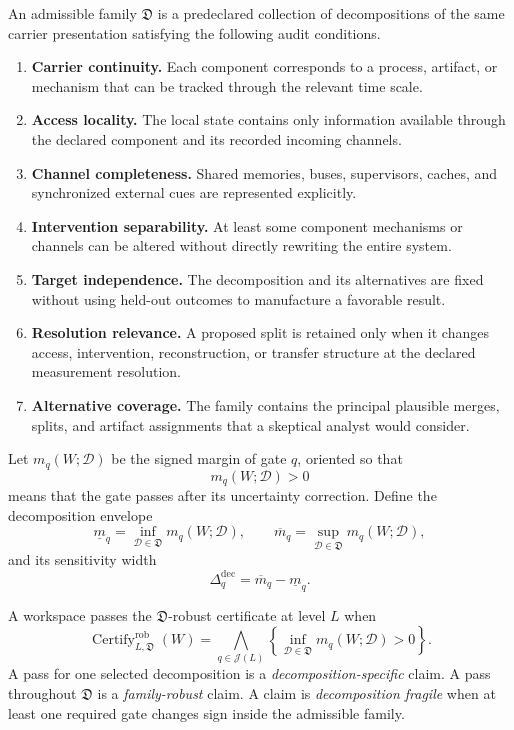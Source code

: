\begin{definition}
\label{def:admissible-decomposition-family}
An admissible family \(\mathfrak D\) is a predeclared collection of
decompositions of the same carrier presentation satisfying the following
audit conditions.
\begin{enumerate}
\item \textbf{Carrier continuity.} Each component corresponds to a process,
 artifact, or mechanism that can be tracked through the relevant time scale.
\item \textbf{Access locality.} The local state contains only information
 available through the declared component and its recorded incoming channels.
\item \textbf{Channel completeness.} Shared memories, buses, supervisors,
 caches, and synchronized external cues are represented explicitly.
\item \textbf{Intervention separability.} At least some component mechanisms
 or channels can be altered without directly rewriting the entire system.
\item \textbf{Target independence.} The decomposition and its alternatives
 are fixed without using held-out outcomes to manufacture a favorable result.
\item \textbf{Resolution relevance.} A proposed split is retained only when
 it changes access, intervention, reconstruction, or transfer structure at the
 declared measurement resolution.
\item \textbf{Alternative coverage.} The family contains the principal
 plausible merges, splits, and artifact assignments that a skeptical analyst
 would consider.
\end{enumerate}
\end{definition}

Let \(m_q(W;\mathcal D)\) be the signed margin of gate \(q\), oriented so that
\[
m_q(W;\mathcal D)>0
\]
means that the gate passes after its uncertainty correction. Define the
decomposition envelope
\[
\underline m_q
=
\inf_{\mathcal D\in\mathfrak D}m_q(W;\mathcal D),
\qquad
\overline m_q
=
\sup_{\mathcal D\in\mathfrak D}m_q(W;\mathcal D),
\]
and its sensitivity width
\[
\Delta_q^{\mathrm{dec}}
=
\overline m_q-\underline m_q.
\]

\begin{definition}
\label{def:decomposition-robust-certificate}
A workspace passes the \(\mathfrak D\)-robust certificate at level \(L\) when
\[
\boxed{
\operatorname{Certify}_{L,\mathfrak D}^{\mathrm{rob}}(W)
=
\bigwedge_{q\in\mathcal J(L)}
\left\{
\inf_{\mathcal D\in\mathfrak D}
 m_q(W;\mathcal D)>0
\right\}.
}
\]
A pass for one selected decomposition is a \emph{decomposition-specific}
claim. A pass throughout \(\mathfrak D\) is a \emph{family-robust} claim. A
claim is \emph{decomposition fragile} when at least one required gate changes
sign inside the admissible family.
\end{definition}

